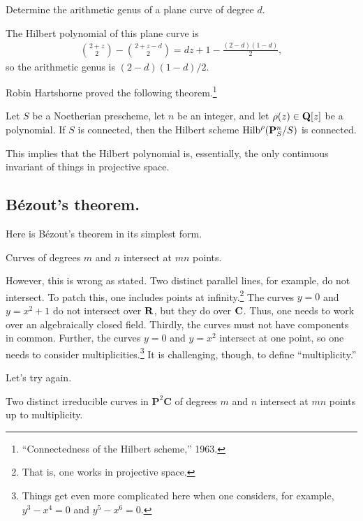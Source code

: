 \documentclass [11 pt, oneside] {article}
\begin{document}
\begin{problem}
	Determine the arithmetic genus of a plane curve of degree $d$.
\end{problem}

The Hilbert polynomial of this plane curve is
\begin{align*}
	\binom{2+z}{2} - \binom{2+z-d}{2} = dz + 1 - \frac{(2-d) (1-d)}{2},
\end{align*}
so the arithmetic genus is $(2-d) (1-d)/2$.

Robin Hartshorne proved the following theorem.\footnote{``Connectedness of the Hilbert scheme,'' 1963.}

\begin{theorem}[Hartshorne]\label{}\index{}\text{}
Let $S$ be a Noetherian prescheme, let $n$ be an integer, and let $\rho(z)\in\mathbf Q [z]$ be a polynomial. If $S$ is connected, then the Hilbert scheme $\operatorname{Hilb}^\rho(\mathbf{P}^n_S/S)$ is connected.
\end{theorem}

This implies that the Hilbert polynomial is, essentially, the only continuous invariant of things in projective space.

\subsection{B\'ezout's theorem.}
Here is B\'ezout's theorem in its simplest form.
\begin{theorem}[B\'ezout]\label{b_1}\text{}
Curves of degrees $m$ and $n$ intersect at $mn$ points.
\end{theorem}
However, this is wrong as stated. Two distinct parallel lines, for example, do not intersect. To patch this, one includes points at infinity.\footnote{That is, one works in projective space.} The curves $y=0$ and $y=x^2+1$ do not intersect over $\mathbf R$, but they do over $\mathbf C$. Thus, one needs to work over an algebraically closed field. Thirdly, the curves must not have components in common. Further, the curves $y=0$ and $y=x^2$ intersect at one point, so one needs to consider multiplicities.\footnote{Things get even more complicated here when one considers, for example, $y^3-x^4=0$ and $y^5 - x^6=0$.} It is challenging, though, to define ``multiplicity.''

Let's try again.

\begin{theorem}[B\'ezout]\label{b_2}\text{}
Two distinct irreducible curves in $\mathbf{P}^2\mathbf{C}$ of degrees $m$ and $n$ intersect at $mn$ points up to multiplicity.
\end{theorem}
\end{document}
